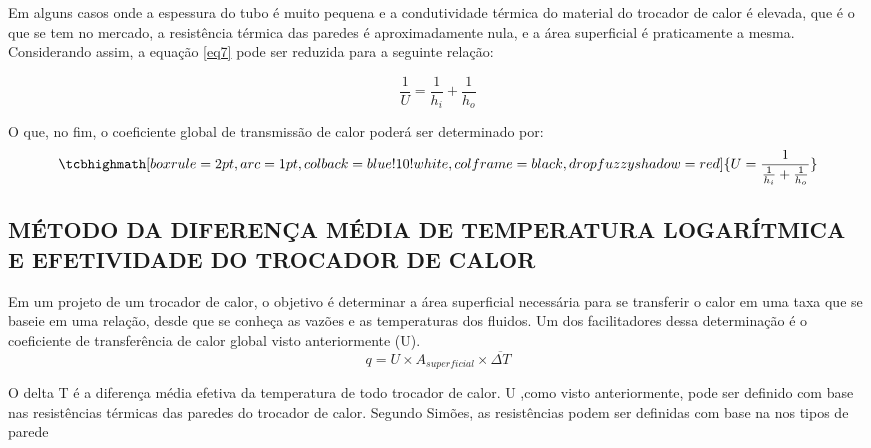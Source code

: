 \documentclass[a4paper,12pt,oneside]{article}
\begin{document}
\begin{flushright}
Em alguns casos onde a espessura do tubo é muito pequena e a condutividade térmica do material do trocador de calor é elevada, que é o que se tem no mercado, a resistência térmica das paredes é aproximadamente nula, e a área superficial é praticamente a mesma. Considerando assim, a equação \ref{eq7} pode ser reduzida para a seguinte relação:
\pagebreak
\clearpage
\newpage


\begin{equation}\label{eq8}
\frac{1}{U} = \frac{1}{h_i} + \frac{1}{h_o}
\end{equation}
\vspace{0.5cm}

O que, no fim, o coeficiente global de transmissão de calor poderá ser determinado por:\\

\begin{equation}\label{eq9}
 	\tcbhighmath[boxrule=2pt,arc=1pt,colback=blue!10!white,colframe=black,
 drop fuzzy shadow=red]{U = \frac{1}{\frac{1}{h_i} + \frac{1}{h_o}}}
\end{equation}
\vspace{0.5cm}

\pagebreak
\clearpage
\newpage

\subsection{\large MÉTODO DA DIFERENÇA MÉDIA DE TEMPERATURA LOGARÍTMICA E EFETIVIDADE DO TROCADOR DE CALOR}
\vspace{0.5cm}
 
Em um projeto de um trocador de calor, o objetivo é determinar a área superficial necessária para se transferir o calor em uma taxa que se baseie em uma relação, desde que se conheça as vazões e as temperaturas dos fluidos. Um dos facilitadores dessa determinação é o coeficiente de transferência de calor global visto anteriormente (U).\\

\begin{equation}\label{eq10}
	q = U \times A_{superficial} \times \overline{\Delta T}
\end{equation}
\vspace{0.5cm}

O delta T é a diferença média efetiva da temperatura de todo trocador de calor. U ,como visto anteriormente, pode ser definido com base nas resistências térmicas das paredes do trocador de calor. Segundo Simões, as resistências podem ser definidas com base na nos tipos de parede\\


\end{flushright}
\end{document}
